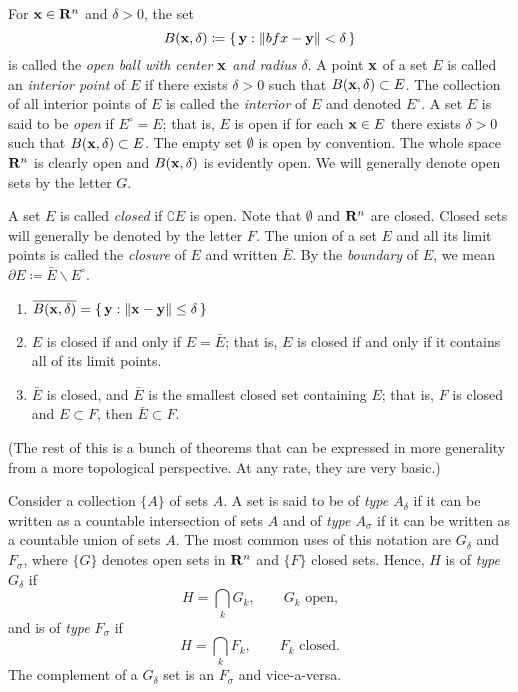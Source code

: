 For $\mathbf{x}\in\mathbf{R}^n$ and $\delta>0$, the set
\begin{equation}
\label{eq:open-ball-r-n}
B(\mathbf{x},\delta)\coloneqq\left\{\,\mathbf{y}:\|bfx-\mathbf{y}\|<\delta\,\right\}
\end{equation}
is called the \emph{open ball with center $\mathbf{x}$ and radius $\delta$}. A
point $\mathbf{x}$ of a set $E$ is called an \emph{interior point} of $E$ if
there exists $\delta>0$ such that $B(\mathbf{x},\delta)\subset E$. The collection
of all interior points of $E$ is called the \emph{interior} of $E$ and
denoted $E^\circ$. A set $E$ is said to be \emph{open} if $E^\circ=E$; that
is, $E$ is open if for each $\mathbf{x}\in E$ there exists $\delta>0$ such that
$B(\mathbf{x},\delta)\subset E$. The empty set $\emptyset$ is open by
convention. The whole space $\mathbf{R}^n$ is clearly open and $B(\mathbf{x},\delta)$
is evidently open. We will generally denote open sets by the letter $G$.

A set $E$ is called \emph{closed} if $\complement E$ is open. Note that
$\emptyset$ and $\mathbf{R}^n$ are closed. Closed sets will generally be denoted
by the letter $F$. The union of a set $E$ and all its limit points is
called the \emph{closure} of $E$ and written $\bar E$. By the
\emph{boundary} of $E$, we mean $\partial E\coloneqq \bar E\smallsetminus
E^\circ$.
\begin{theorem}[1.5]
\begin{enumerate}[label=\textnormal{(\roman*)}]
\item $\overline{B(\mathbf{x},\delta)}=\left\{\,\mathbf{y}:\|\mathbf{x}-\mathbf{y}\|\leq\delta\, \right\}$
\item $E$ is closed if and only if $E=\bar E$; that is, $E$ is closed if
  and only if it contains all of its limit points.
\item $\bar E$ is closed, and $\bar E$ is the smallest closed set
  containing $E$; that is, $F$ is closed and $E\subset F$, then $\bar
  E\subset F$.
\end{enumerate}
\end{theorem}

(The rest of this is a bunch of theorems that can be expressed in more
generality from a more topological perspective. At any rate, they are very
basic.)

Consider a collection $\{A\}$ of sets $A$. A set is said to be of \emph{type
$A_\delta$} if it can be written as a countable intersection of sets $A$
and of \emph{type $A_\sigma$} if it can be written as a countable union of
sets $A$. The most common uses of this notation are $G_\delta$ and
$F_\sigma$, where $\{G\}$ denotes open sets in $\mathbf{R}^n$ and $\{F\}$ closed
sets. Hence, $H$ is of \emph{type $G_\delta$} if
\begin{equation}
  \label{eq:G-delta}
H=\bigcap_k G_k,\qquad \text{$G_k$ open,}
\end{equation}
and is of \emph{type $F_\sigma$} if
\begin{equation}
  \label{eq:F-sigma}
H=\bigcap_k F_k,\qquad\text{$F_k$ closed.}
\end{equation}
The complement of a $G_\delta$ set is an $F_\sigma$ and vice-a-versa.

